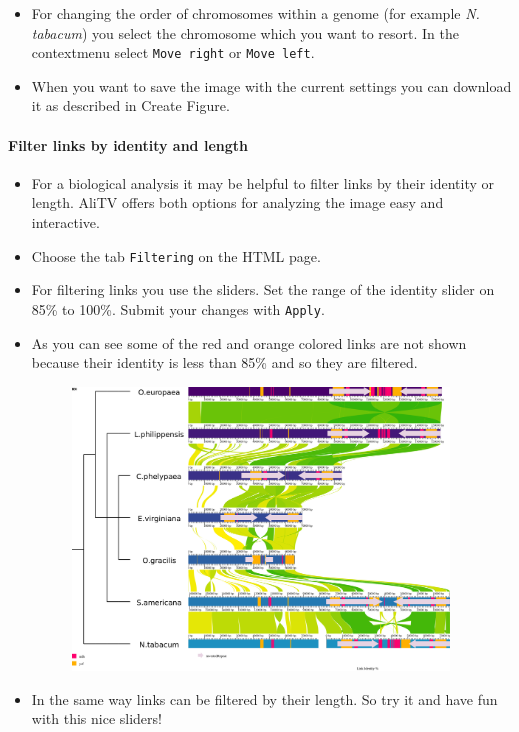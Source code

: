 \documentclass[a4paper]{scrartcl}
\begin{document}
\begin{itemize}
	\item For changing the order of chromosomes within a genome (for example \emph{N. tabacum}) you select the chromosome which you want to resort. In the contextmenu select \texttt{Move right} or \texttt{Move left}.
	\item When you want to save the image with the current settings you can download it as described in Create Figure.
\end{itemize}

\paragraph*{Filter links by identity and length}
\begin{itemize}
	\item For a biological analysis it may be helpful to filter links by their identity or length. AliTV offers both options for analyzing the image easy and interactive.
	\item Choose the tab \texttt{Filtering} on the HTML page.
	\item For filtering links you use the sliders. Set the range of the identity slider on 85\% to 100\%. Submit your changes with \texttt{Apply}.
	\item As you can see some of the red and orange colored links are not shown because their identity is less than 85\% and so they are filtered.
	
	\begin{figure}[H]
		\centering
		\includegraphics[width=10cm]{filterLinks.png}
		\caption{}
	\end{figure}
	
	\item In the same way links can be filtered by their length. So try it and have fun with this nice sliders!
\end{itemize}
\end{document}
